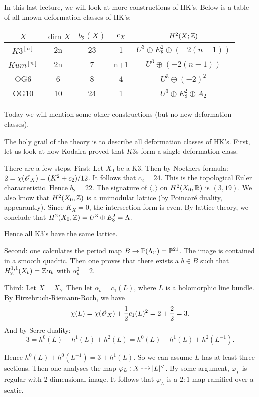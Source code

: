 \documentclass[11pt, english]{article}
\begin{document}
In this last lecture, we will look at more constructions of HK's. Below is a table of all known deformation classes of HK's:

\begin{center}
\begin{tabular}{c | c | c | c | c}
$X$ & $\dim X$ & $b_2(X)$ & $c_X$ & $H^2(X; \mathbb{Z})$ \\
\hline 
$K3^{[n]}$ & 2n & 23 & 1 & $U^3 \oplus E_8^2 \oplus (-2(n-1))$ \\
$Kum^{[n]}$ & 2n & 7 & n+1 & $U^3 \oplus (-2(n-1))$ \\
OG6 & 6 & 8 & 4 & $U^3 \oplus (-2)^2$ \\
OG10 & 10 & 24 & 1 & $U^3 \oplus E_8^2 \oplus A_2$
\end{tabular}
\end{center}

Today we will mention some other constructions (but no new deformation classes).

The holy grail of the theory is to describe all deformation classes of HK's. First, let us look at how Kodaira proved that $K3$s form a single deformation class.

There are a few steps. First: Let $X_0$ be a K3. Then by Noethers formula: $2= \chi(\operatorname{\mathscr{O}}_X) = (K^2 + c_2)/12$. It follows that $c_2=24$. This is the topological Euler characteristic. Hence $b_2=22$. The signature of $\langle,\rangle$ on $H^2(X_0,\mathbb{R})$ is $(3,19)$. We also know that $H^2(X_0,\mathbb{Z})$ is a unimodular lattice (by Poincaré duality, appearantly). Since $K_X=0$, the intersection form is even. By lattice theory, we conclude that $H^2(X_0,\mathbb{Z}) = U^3 \oplus E_8^2 =\Lambda$.

Hence all  K3's have the same lattice.

Second: one calculates the period map $B \to \mathbb{P}(\Lambda_{\mathbb{C}}) = \mathbb{P}^{21}$. The image is contained in a smooth quadric. Then one proves that there exists a $b \in B$ such that $H_{\mathbb{Z}}^{1,1}(X_b) = \mathbb{Z} \alpha_b$ with $\alpha_b^2=2$. 

Third: Let $X=X_b$. Then let $\alpha_b = c_1(L)$, where $L$ is a holomorphic line bundle. By Hirzebruch-Riemann-Roch, we have
$$
\chi(L) = \chi(\operatorname{\mathscr{O}}_X) + \frac 12 c_1(L)^2 = 2+ \frac 22 = 3.
$$
And by Serre duality:
$$
3 = h^0(L) - h^1(L) +h^2(L) = h^0(L) -h^1(L) + h^2(L^{-1}). 
$$

Hence $h^0(L) + h^0(L^{-1}) = 3+ h^1(L)$. So we can assume $L$ has at least three sections. Then one analyses the map $\varphi_L:X \rmap |L|^\vee$. By some argument, $\varphi_L$ is regular with 2-dimensional image. It follows that $\varphi_L$ is a $2:1$ map ramified over a sextic. 
\end{document}
